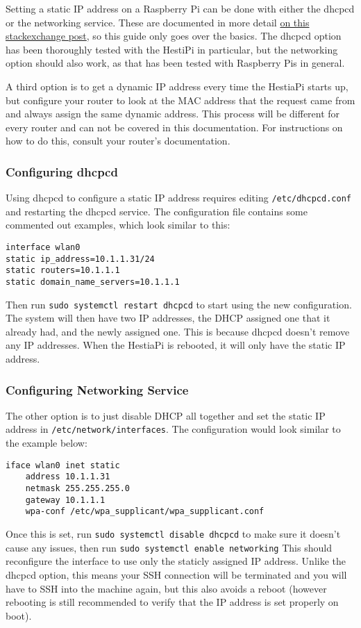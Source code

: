 Setting a static IP address on a Raspberry Pi can be done with either the
dhcpcd or the networking service.  These are documented in more detail
\href{https://raspberrypi.stackexchange.com/questions/37920/how-do-i-set-up-networking-wifi-static-ip-address/74428#74428}
{on this stackexchange post}, so this guide only goes over the basics.  The
dhcpcd option has been thoroughly tested with the HestiPi in particular, but
the networking option should also work, as that has been tested with Raspberry
Pis in general.

A third option is to get a dynamic IP address every time the HestiaPi starts
up, but configure your router to look at the MAC address that the request came
from and always assign the same dynamic address.  This process will be
different for every router and can not be covered in this documentation.  For
instructions on how to do this, consult your router's documentation.

\subsubsection{Configuring dhcpcd}
Using dhcpcd to configure a static IP address requires editing
\texttt{/etc/dhcpcd.conf} and restarting the dhcpcd service.  The configuration
file contains some commented out examples, which look similar to this:

\begin{verbatim}
interface wlan0
static ip_address=10.1.1.31/24
static routers=10.1.1.1
static domain_name_servers=10.1.1.1
\end{verbatim}

Then run \texttt{sudo systemctl restart dhcpcd} to start using the new
configuration.  The system will then have two IP addresses, the DHCP assigned
one that it already had, and the newly assigned one.  This is because dhcpcd
doesn't remove any IP addresses.  When the HestiaPi is rebooted, it will only
have the static IP address.

\subsubsection{Configuring Networking Service}
The other option is to just disable DHCP all together and set the static IP
address in \texttt{/etc/network/interfaces}.  The configuration would look
similar to the example below:

\begin{verbatim}
iface wlan0 inet static
    address 10.1.1.31
    netmask 255.255.255.0
    gateway 10.1.1.1
    wpa-conf /etc/wpa_supplicant/wpa_supplicant.conf
\end{verbatim}

Once this is set, run \texttt{sudo systemctl disable dhcpcd} to make sure
it doesn't cause any issues, then run \texttt{sudo systemctl enable networking}
This should reconfigure the interface to use only the staticly assigned IP
address.  Unlike the dhcpcd option, this means your SSH connection will be
terminated and you will have to SSH into the machine again, but this also
avoids a reboot (however rebooting is still recommended to verify that the
IP address is set properly on boot).

